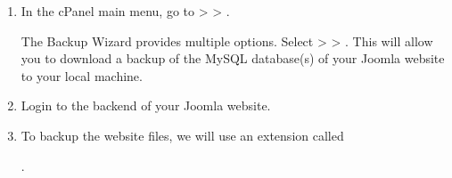\documentclass[a4paper,10pt,english,openany,oneside]{sphinxmanual}
\begin{document}
\begin{enumerate}
\begin{itemize}
\end{itemize}

\item {} 
\sphinxAtStartPar
In the cPanel main menu, go to  >  > .
\begin{quote}

\begin{figure}[H]
\centering

\noindent{}
\end{figure}
\end{quote}

\sphinxAtStartPar
The Backup Wizard provides multiple options. Select  >  > . This will allow you to download a backup of the MySQL database(s) of your Joomla website to your local machine.
\begin{quote}

\begin{figure}[H]
\centering

\noindent{}
\end{figure}
\end{quote}

\item {} 
\sphinxAtStartPar
Login to the backend of your Joomla website.
\begin{quote}

\begin{figure}[H]
\centering

\noindent{}
\end{figure}

\newpage
\end{quote}

\item {} 
\sphinxAtStartPar
To backup the website files, we will use an extension called %
\begin{footnote}[7]\sphinxAtStartFootnote
{}
%
\end{footnote}.
\begin{quote}

\begin{figure}[H]
\centering


\end{figure}
\end{quote}
\end{enumerate}
\end{document}
